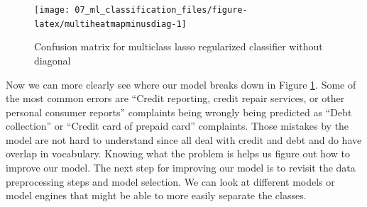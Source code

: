 \documentclass[
]{krantz}
\makeatletter
\newenvironment{Shaded}{\begin{snugshade}}{\end{snugshade}}
\newcommand{\AttributeTok}[1]{\textcolor[rgb]{0.77,0.63,0.00}{#1}}
\newcommand{\ControlFlowTok}[1]{\textcolor[rgb]{0.13,0.29,0.53}{\textbf{#1}}}
\newcommand{\DecValTok}[1]{\textcolor[rgb]{0.00,0.00,0.81}{#1}}
\newcommand{\FunctionTok}[1]{\textcolor[rgb]{0.00,0.00,0.00}{#1}}
\newcommand{\NormalTok}[1]{#1}
\newcommand{\SpecialCharTok}[1]{\textcolor[rgb]{0.00,0.00,0.00}{#1}}
\newcommand{\StringTok}[1]{\textcolor[rgb]{0.31,0.60,0.02}{#1}}
\newenvironment{kframe}{%
\medskip{}
\setlength{\fboxsep}{.8em}
 \def\at@end@of@kframe{}%
 \ifinner\ifhmode%
  \def\at@end@of@kframe{\end{minipage}}%
  \begin{minipage}{\columnwidth}%
 \fi\fi%
 \def\FrameCommand##1{\hskip\@totalleftmargin \hskip-\fboxsep
 \colorbox{shadecolor}{##1}\hskip-\fboxsep
     \hskip-\linewidth \hskip-\@totalleftmargin \hskip\columnwidth}%
 \MakeFramed {\advance\hsize-\width
   \@totalleftmargin\z@ \linewidth\hsize
   \@setminipage}}%
 {\par\unskip\endMakeFramed%
 \at@end@of@kframe}
\renewenvironment{Shaded}{\begin{kframe}}{\end{kframe}}
\makeatother
\begin{document}
\begin{Shaded}
\end{Shaded}

\begin{figure}

{\centering \texttt{[image: 07\_ml\_classification\_files/figure-latex/multiheatmapminusdiag-1]} 

}

\caption{Confusion matrix for multiclass lasso regularized classifier without diagonal}\label{fig:multiheatmapminusdiag}
\end{figure}

Now we can more clearly see where our model breaks down in Figure \ref{fig:multiheatmapminusdiag}. Some of the most common errors are ``Credit reporting, credit repair services, or other personal consumer reports'' complaints being wrongly being predicted as ``Debt collection'' or ``Credit card of prepaid card'' complaints. Those mistakes by the model are not hard to understand since all deal with credit and debt and do have overlap in vocabulary.
Knowing what the problem is helps us figure out how to improve our model.
The next step for improving our model is to revisit the data preprocessing steps and model selection.
We can look at different models or model engines that might be able to more easily separate the classes.
\end{document}
